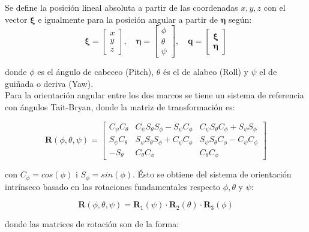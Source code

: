 \documentclass[twoside,11pt]{book}
\begin{document}
Se define la posición lineal absoluta a partir de las coordenadas $x,y,z$ con el vector $\pmb{\xi}$ e igualmente para la posición angular a partir de $\pmb{\eta}$ según:
\begin{equation} 
\pmb{\xi}=\left[ \begin{array}{ccc}
x\\
y\\
z \end{array} \right] ,\quad \pmb{\eta}=\left[ \begin{array}{ccc}
\phi\\
\theta\\
\psi \end{array} \right] , \quad \pmb{q}=\left[\begin{array}{c}
\pmb{\xi}\\
\pmb{\eta} \end{array} \right] 
\end{equation}

donde $\phi$ es el ángulo de cabeceo (Pitch), $\theta$ és el de alabeo (Roll) y $\psi$ el de guiñada o deriva (Yaw).\\
Para la orientación angular entre los dos marcos se tiene un sistema de referencia con ángulos Tait-Bryan, donde la matriz de transformación es:

\begin{equation}
\pmb{R}(\phi,\theta,\psi)=\left[\begin{array}{ccc}
C_\psi C_\theta & C_\psi S_\theta S_\phi - S_\psi C_\phi & C_\psi S_\theta C_\phi + S_\psi S_\phi \\
S_\psi C_\theta & S_\psi S_\theta S_\phi + C_\psi C_\phi & S_\psi S_\theta C_\phi - C_\psi C_\phi \\
-S_\theta & C_\theta C_\phi & C_\theta C_\phi 
\end{array}\right]
\end{equation}

con $C_\phi=cos(\phi)$ i $S_\phi=sin(\phi)$. Ésto se obtiene del sistema de  orientación intrínseco basado en las rotaciones fundamentales respecto $\phi,\theta$ y $\psi$:

\begin{equation}
\pmb{R}(\phi,\theta,\psi)=\pmb{R}_{1}(\psi)\cdot \pmb{R}_{2}(\theta)\cdot \pmb{R}_{3}(\phi)
\end{equation}

donde las matrices de rotación son de la forma:
\end{document}
